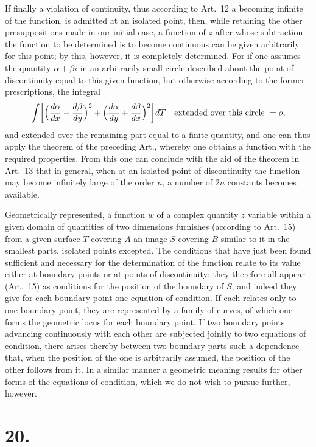 \documentclass{article}
\begin{document}
If finally a violation of continuity, thus according to Art.~12 a becoming infinite of the function, is admitted at an isolated point, then, while retaining the other presuppositions made in our initial case, a function of $z$ after whose subtraction the function to be determined is to become continuous can be given arbitrarily for this point; by this, however, it is completely determined. For if one assumes the quantity $\alpha + \beta i$ in an arbitrarily small circle described about the point of discontinuity equal to this given function, but otherwise according to the former prescriptions, the integral
\[
\int \biggl[\Bigl(\frac{d\alpha}{dx} - \frac{d\beta}{dy}\Bigr)^2 + \Bigl(\frac{d\alpha}{dy} + \frac{d\beta}{dx}\Bigr)^2\biggr] dT \quad \text{extended over this circle } = o,
\]
and extended over the remaining part equal to a finite quantity, and one can thus apply the theorem of the preceding Art., whereby one obtains a function with the required properties. From this one can conclude with the aid of the theorem in Art.~13 that in general, when at an isolated point of discontinuity the function may become infinitely large of the order $n$, a number of $2n$ constants becomes available.

Geometrically represented, a function $w$ of a complex quantity $z$ variable within a given domain of quantities of two dimensions furnishes (according to Art.~15) from a given surface $T$ covering $A$ an image $S$ covering $B$ similar to it in the smallest parts, isolated points excepted. The conditions that have just been found sufficient and necessary for the determination of the function relate to its value either at boundary points or at points of discontinuity; they therefore all appear (Art.~15) as conditions for the position of the boundary of $S$, and indeed they give for each boundary point one equation of condition. If each relates only to one boundary point, they are represented by a family of curves, of which one forms the geometric locus for each boundary point. If two boundary points advancing continuously with each other are subjected jointly to two equations of condition, there arises thereby between two boundary parts such a dependence that, when the position of the one is arbitrarily assumed, the position of the other follows from it. In a similar manner a geometric meaning results for other forms of the equations of condition, which we do not wish to pursue further, however.

\section*{20.}
\end{document}
